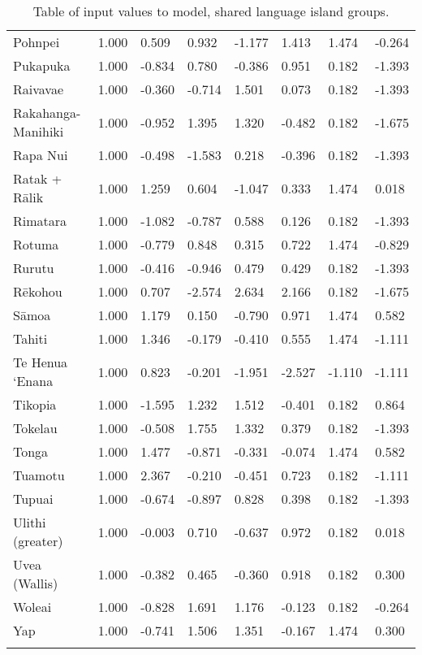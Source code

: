 \begin{longtable}{p{4.5cm}p{1.7cm}p{1.7cm}p{1.7cm}p{1.7cm}p{1.7cm}p{1.7cm}p{1.7cm}}
  Pohnpei & 1.000 & 0.509 & 0.932 & -1.177 & 1.413 & 1.474 & -0.264 \\ 
  Pukapuka & 1.000 & -0.834 & 0.780 & -0.386 & 0.951 & 0.182 & -1.393 \\ 
  Raivavae & 1.000 & -0.360 & -0.714 & 1.501 & 0.073 & 0.182 & -1.393 \\ 
  Rakahanga-Manihiki & 1.000 & -0.952 & 1.395 & 1.320 & -0.482 & 0.182 & -1.675 \\ 
  Rapa Nui & 1.000 & -0.498 & -1.583 & 0.218 & -0.396 & 0.182 & -1.393 \\ 
  Ratak + Rālik & 1.000 & 1.259 & 0.604 & -1.047 & 0.333 & 1.474 & 0.018 \\ 
  Rimatara & 1.000 & -1.082 & -0.787 & 0.588 & 0.126 & 0.182 & -1.393 \\ 
  Rotuma & 1.000 & -0.779 & 0.848 & 0.315 & 0.722 & 1.474 & -0.829 \\ 
  Rurutu & 1.000 & -0.416 & -0.946 & 0.479 & 0.429 & 0.182 & -1.393 \\ 
  Rēkohou & 1.000 & 0.707 & -2.574 & 2.634 & 2.166 & 0.182 & -1.675 \\ 
  Sāmoa & 1.000 & 1.179 & 0.150 & -0.790 & 0.971 & 1.474 & 0.582 \\ 
  Tahiti & 1.000 & 1.346 & -0.179 & -0.410 & 0.555 & 1.474 & -1.111 \\ 
  Te Henua ‘Enana & 1.000 & 0.823 & -0.201 & -1.951 & -2.527 & -1.110 & -1.111 \\ 
  Tikopia & 1.000 & -1.595 & 1.232 & 1.512 & -0.401 & 0.182 & 0.864 \\ 
  Tokelau & 1.000 & -0.508 & 1.755 & 1.332 & 0.379 & 0.182 & -1.393 \\ 
  Tonga & 1.000 & 1.477 & -0.871 & -0.331 & -0.074 & 1.474 & 0.582 \\ 
  Tuamotu & 1.000 & 2.367 & -0.210 & -0.451 & 0.723 & 0.182 & -1.111 \\ 
  Tupuai & 1.000 & -0.674 & -0.897 & 0.828 & 0.398 & 0.182 & -1.393 \\ 
  Ulithi (greater) & 1.000 & -0.003 & 0.710 & -0.637 & 0.972 & 0.182 & 0.018 \\ 
  Uvea (Wallis) & 1.000 & -0.382 & 0.465 & -0.360 & 0.918 & 0.182 & 0.300 \\ 
  Woleai & 1.000 & -0.828 & 1.691 & 1.176 & -0.123 & 0.182 & -0.264 \\ 
  Yap & 1.000 & -0.741 & 1.506 & 1.351 & -0.167 & 1.474 & 0.300 \\ 
   \bottomrule
\caption{Table of input values to model, shared language island groups.} 
\label{appendix_medium_table}
\end{longtable}
